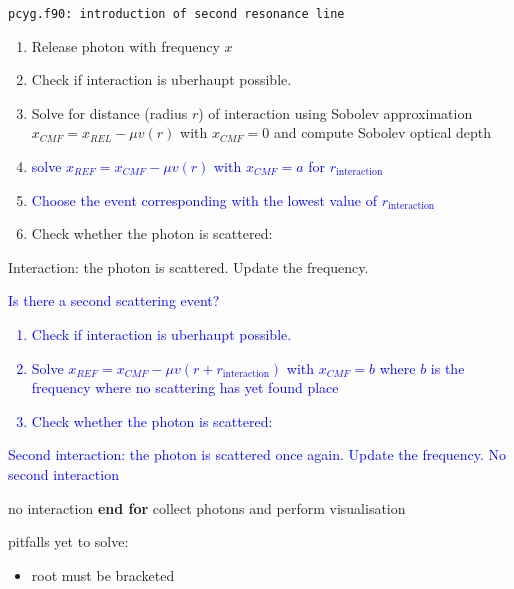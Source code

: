 \documentclass[../main/main.tex]{subfiles}
\begin{document}
\begin{center}
\vspace{-0.45cm}
\begin{algorithm}[!htp]
\caption{\texttt{pcyg.f90: introduction of second resonance line}}
\label{pcyg_one_line}
\begin{algorithmic}

\begin{enumerate}
\item Release photon with frequency $x$
\item Check if interaction is uberhaupt possible.
\item Solve for distance (radius $r$) of interaction using Sobolev approximation $x_{CMF} = x_{REL} - \mu v(r)$ with $\boxed{x_{CMF} = 0}$ and compute Sobolev optical depth 
\item \textcolor{blue}{solve $x_{REF} = x_{CMF} - \mu v(r)$ with $\boxed{x_{CMF} = a}$ for $r_{\text{interaction}}$}
\item \textcolor{blue}{Choose the event corresponding with the lowest value of $r_{\text{interaction}}$}
\item Check whether the photon is scattered:
\end{enumerate}
\State Interaction: the photon is scattered. Update the frequency.
\textcolor{blue}{Is there a second scattering event?
\begin{enumerate}[leftmargin=0.6in]
\item Check if interaction is uberhaupt possible.
\item Solve $x_{REF} = x_{CMF} - \mu v(r+ r_{\text{interaction}})$ with $\boxed{x_{CMF} =b}$ where $b$ is the frequency where no scattering has yet found place
\item Check whether the photon is scattered:
\end{enumerate}}
\State \textcolor{blue}{Second interaction: the photon is scattered once again. Update the frequency.}
\Else \State \textcolor{blue}{No second interaction}
\EndIf

\Else \State no interaction
\EndIf	
\EndFor
\State \textbf{end for}
\State collect photons and perform visualisation
\end{algorithmic}
\end{algorithm}
\end{center}

\newpage
pitfalls yet to solve:
\begin{itemize}
\item root must be bracketed
\end{itemize}
\end{document}
